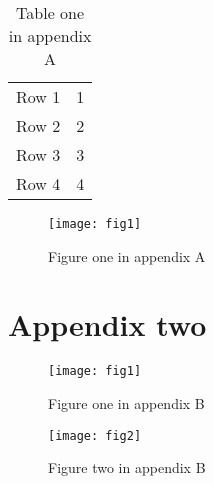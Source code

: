 \documentclass{article}
\begin{document}
\begin{table}
    \begin{tabular}{ll}
        Row 1 & 1\\
        Row 2 & 2\\
        Row 3 & 3\\
        Row 4 & 4\\
    \end{tabular}
\caption{Table one in appendix A}\label{Table-A1}
\end{table}

\begin{figure}
    \texttt{[image: fig1]}
\caption{Figure one in appendix A} \label{Figure-A1}
\end{figure}

\section{Appendix two}

\begin{figure}
    \texttt{[image: fig1]}
\caption{Figure one in appendix B} \label{Figure-B1}
\end{figure}

\begin{figure}
    \texttt{[image: fig2]}
\caption{Figure two in appendix B} \label{Figure-B2}
\end{figure}

\renewcommand{\thefigure}{\arabic{figure}}
\renewcommand{\thetable}{\arabic{table}}
\end{document}
